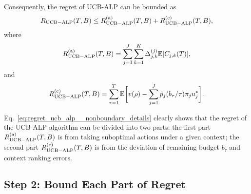 Consequently, the regret of UCB-ALP can be bounded as
\begin{eqnarray}\label{eq:regret_ucb_alp__nonboundary_details}
R_{\rm {UCB-ALP}}(T, B) \leq R_{\rm {UCB-ALP}}^{({\rm a})}(T, B) + R_{\rm {UCB-ALP}}^{({\rm c})}(T, B),
\end{eqnarray}
where
\begin{eqnarray}
R_{\rm {UCB-ALP}}^{({\rm a})}(T, B) = \sum_{j=1}^J \sum_{k=1}^K \Delta_{j,k}^{(j)}\mathbb{E}[C_{j,k}(T)], \nonumber
\end{eqnarray}
and
\begin{eqnarray}
R_{\rm {UCB-ALP}}^{({\rm c})}(T, B) = \sum_{\tau  = 1}^T \mathbb{E}\bigg[v(\rho) -\sum_{j = 1}^J \hat{p}_j(b_{\tau}/\tau) \pi_j u_j^*\bigg]. \nonumber
\end{eqnarray}

Eq.~\eqref{eq:regret_ucb_alp__nonboundary_details} clearly shows that the regret of the UCB-ALP algorithm can be divided into two parts: the first part $R_{\rm {UCB-ALP}}^{({\rm a})}(T, B)$ is from taking  suboptimal actions under a given context; the second part $R_{\rm {UCB-ALP}}^{({\rm c})}(T, B)$ is from the deviation of remaining budget $b_{\tau}$ and context ranking errors.

\subsection{Step 2: Bound Each Part of Regret}

